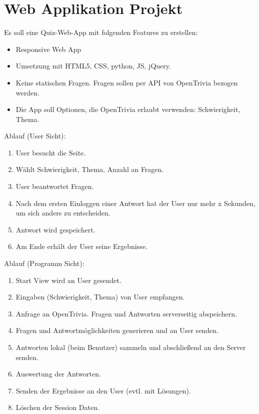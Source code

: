 \documentclass[12pt, a4paper]{report}
\begin{document}
\section*{Web Applikation Projekt}
Es soll eine Quiz-Web-App mit folgenden Features zu erstellen:
\begin{itemize}
	\item Responsive Web App
	\item Umsetzung mit HTML5, CSS, python, JS, jQuery.
	\item Keine statischen Fragen. Fragen sollen per API von OpenTrivia bezogen werden.
	\item Die App soll Optionen, die OpenTrivia erlaubt verwenden: Schwierigkeit, Thema.
\end{itemize}
Ablauf (User Sicht):
\begin{enumerate}
	\item User besucht die Seite.
	\item Wählt Schwierigkeit, Thema, Anzahl an Fragen.
	\item User beantwortet Fragen.
	\item Nach dem ersten Einloggen einer Antwort hat der User nur mehr x Sekunden, um sich anders zu entscheiden.
	\item Antwort wird gespeichert.
	\item Am Ende erhält der User seine Ergebnisse.
\end{enumerate}

Ablauf (Programm Sicht):
\begin{enumerate}
	\item Start View wird an User gesendet.
	\item Eingaben (Schwierigkeit, Thema) von User empfangen.
	\item Anfrage an OpenTrivia. Fragen und Antworten serverseitig abspeichern.
	\item Fragen und Antwortmöglichkeiten generieren und an User senden.
	\item Antworten lokal (beim Benutzer) sammeln und abschließend an den Server senden.
	\item Auswertung der Antworten.
	\item Senden der Ergebnisse an den User (evtl. mit Lösungen).
	\item Löschen der Session Daten.	
\end{enumerate}
\end{document}
